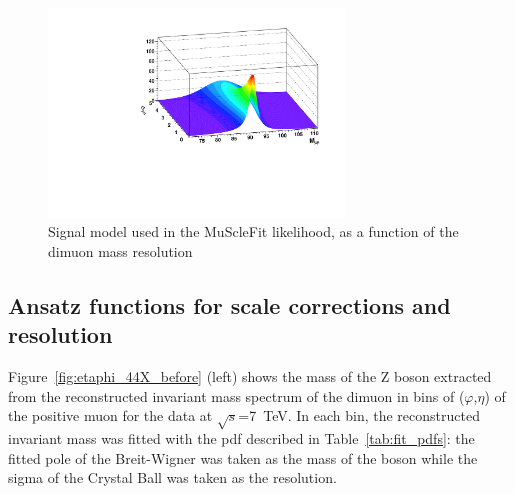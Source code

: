 \begin{figure}[hbtp]  
\begin{center}
\includegraphics[width=0.7\textwidth]{figures/Lineshape_SURF2}
 \hspace{1cm} 
   \caption{Signal model used in the MuScleFit likelihood, as a function of the dimuon mass resolution
   \label{fig:lineshape}}
 \end{center}
\end{figure} 


\subsection{Ansatz functions for scale corrections and resolution}
Figure~\ref{fig:etaphi_44X_before} (left) shows the 
mass of the Z boson extracted from the reconstructed 
invariant mass spectrum of the dimuon in bins of
($\varphi$,$\eta$) of the positive muon for the data at
$\sqrt{s}$=7~TeV.
In each bin, the reconstructed invariant mass
was fitted with the pdf described in Table~\ref{tab:fit_pdfs}: 
the fitted pole of the Breit-Wigner was taken as the mass of the boson 
while the sigma of the Crystal Ball was taken as the resolution.

